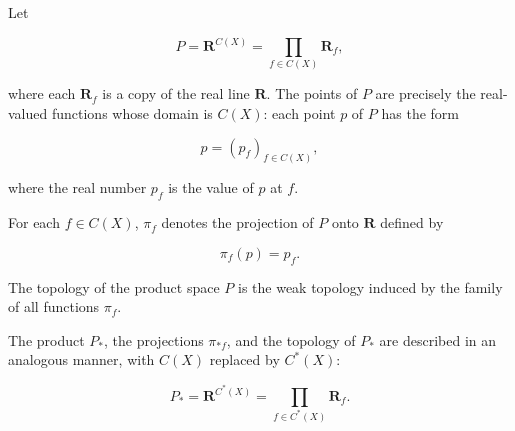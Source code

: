 Let

$$P = \mathbf{R}^{C(X)} = \prod_{f \in C(X)} \mathbf{R}_f,$$

where each $\mathbf{R}_f$ is a copy of the real line $\mathbf{R}$. The points of $P$ are precisely the real-valued functions whose domain is $C(X)$: each point $p$ of $P$ has the form

$$p = (p_f)_{f \in C(X)},$$

where the real number $p_f$ is the value of $p$ at $f$.

For each $f \in C(X)$, $\pi_f$ denotes the projection of $P$ onto $\mathbf{R}$ defined by

$$\pi_f(p) = p_f.$$

The topology of the product space $P$ is the weak topology induced by the family of all functions $\pi_f$.

The product $P_*$, the projections $\pi_{*f}$, and the topology of $P_*$ are described in an analogous manner, with $C(X)$ replaced by $C^*(X)$:

$$P_* = \mathbf{R}^{C^*(X)} = \prod_{f \in C^*(X)} \mathbf{R}_f.$$
